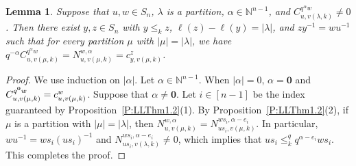 \documentclass[11pt]{article}
\newtheorem{lemma}[theo]{Lemma}
\theoremstyle{definition}
\numberwithin{equation}{section}
\newcommand{\NN}{{\mathbb N}}
\newcommand{\bzero}{{\mathbf 0}}
\begin{document}
\begin{lemma} \label{L:Quantum_is_Classical}
  Suppose that $u,w\in S_n$, $\lambda$ is a partition, $\alpha\in\NN^{n-1}$, and $C^{q^\alpha w}_{u,v(\lambda,k)}\neq 0$.
  Then there exist $y,z\in S_n$ with $y\leq_k z$, $\ell(z)-\ell(y)=|\lambda|$, and $zy^{-1}=wu^{-1}$
  such that for every partition $\mu$ with $|\mu|=|\lambda|$, we have
  $q^{-\alpha}C^{q^\alpha w}_{u,v(\mu,k)}=N^{w,\alpha}_{u,v(\mu,k)}=c^{z}_{y,v(\mu,k)}$. 
\end{lemma}

\begin{proof}
  We use induction on $|\alpha|$.
  Let $\alpha\in\NN^{n-1}$.
  When $|\alpha|=0$, $\alpha={\bzero}$ and $C^{q^{\bf 0}w}_{u,v(\mu,k)}=c^w_{u,v(\mu,k)}$.
  Suppose that $\alpha\neq\bzero$.
  Let $i\in[n{-}1]$ be the index guaranteed by Proposition~\ref{P:LLThm1.2}(1).
  By Proposition~\ref{P:LLThm1.2}(2), if $\mu$ is a partition with $|\mu|=|\lambda|$, then 
  $N^{w,\alpha}_{u,v(\mu,k)}=N^{ws_i, \alpha-e_i}_{us_i,v(\mu,k)}$.
  In particular,   $wu^{-1}=ws_i(u s_i)^{-1}$  and $N^{ws_i, \alpha-e_i}_{us_i,v(\lambda,k)}\neq 0$, which implies that
  $us_i\leq_k^q q^{\alpha-e_i}w s_i$.
  This completes the proof.
\end{proof}
\end{document}

